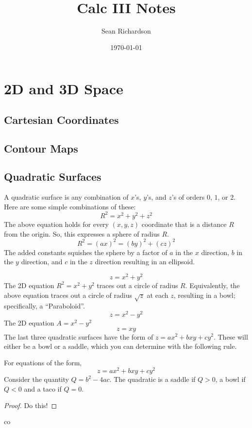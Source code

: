 \documentclass[11pt]{article}
\newenvironment{mybox}
{\begin{tcolorbox}[colback=red!5!white,colframe=red!75!black]}
{\end{tcolorbox}}
\newtheorem{proof}{Proof}
\begin{document}
\title{Calc III Notes}
\author{Sean Richardson}
\date{\today}
\maketitle

\section{2D and 3D Space}
\subsection{Cartesian Coordinates}
\subsection{Contour Maps}
\subsection{Quadratic Surfaces}
A quadratic surface is any combination of $x$'s, $y$'s, and $z$'s of orders $0$, $1$, or $2$. Here are some simple combinations of these:
\begin{equation*}
    R^2 = x^2 + y^2 + z^2
    \tag{Sphere}
\end{equation*}
The above equation holds for every $(x,y,z)$ coordinate that is a distance $R$ from the origin. So, this expresses a sphere of radius $R$.
\begin{equation*}
    R^2 = {(ax)}^2 = {(by)}^2 + {(cz)}^2
    \tag{Ellipsoid}
\end{equation*}
The added constants squishes the sphere by a factor of $a$ in the $x$ direction, $b$ in the $y$ direction, and $c$ in the $z$ direction resulting in an ellipsoid.

\begin{equation*}
    z = x^2+y^2
    \tag{Paraboloid}
\end{equation*}
The 2D equation $R^2 = x^2+y^2$ traces out a circle of radius $R$. Equivalently, the above equation traces out a circle of radius $\sqrt{z}$ at each $z$, resulting in a bowl; specifically, a ``Paraboloid''.
\begin{equation*}
    z = x^2-y^2
    \tag{Saddle}
\end{equation*}
The 2D equation $A = x^2 - y^2$
\begin{equation*}
    z = xy
    \tag{Saddle}
\end{equation*}
The last three quadratic surfaces have the form of $z = ax^2+bxy+cy^2$. These will either be a bowl or a saddle, which you can determine with the following rule.
\begin{mybox}
For equations of the form,
\begin{equation*}
   z = ax^2+bxy+cy^2
\end{equation*}
Consider the quantity $Q = b^2-4ac$. The quadratic is a saddle if $Q > 0$, a bowl if $Q < 0$ and a taco if $Q = 0$.
\end{mybox}
\begin{proof}
Do this!
\end{proof}
co
\end{document}
